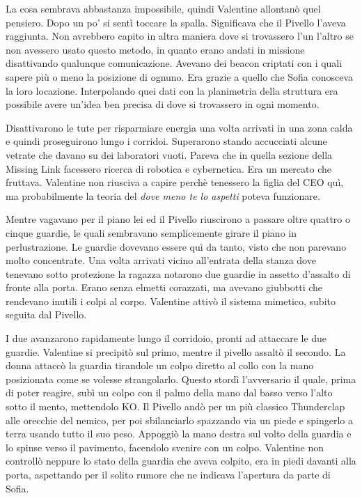     La cosa sembrava abbastanza impossibile, quindi Valentine allontanò quel pensiero. Dopo un po' si sentì toccare la
    spalla. Significava che il Pivello l'aveva raggiunta. Non avrebbero capito in altra maniera dove si trovassero l'un
    l'altro se non avessero usato questo metodo, in quanto erano andati in missione disattivando qualunque
    comunicazione. Avevano dei beacon criptati con i quali sapere più o meno la posizione di ognuno. Era grazie a quello
    che Sofia conosceva la loro locazione. Interpolando quei dati con la planimetria della struttura era possibile avere
    un'idea ben precisa di dove si trovassero in ogni momento.

    Disattivarono le tute per risparmiare energia una volta arrivati in una zona calda e quindi proseguirono lungo i
    corridoi. Superarono stando accucciati alcune vetrate che davano su dei laboratori vuoti. Pareva che in quella
    sezione della Missing Link facessero ricerca di robotica e cybernetica. Era un mercato che fruttava. Valentine non
    riusciva a capire perchè tenessero la figlia del CEO quì, ma probabilmente la teoria del \emph{dove meno te lo
    aspetti} poteva funzionare.

    Mentre vagavano per il piano lei ed il Pivello riuscirono a passare oltre quattro o cinque guardie, le quali
    sembravano semplicemente girare il piano in perlustrazione. Le guardie dovevano essere quì da tanto, visto che non
    parevano molto concentrate. Una volta arrivati vicino all'entrata della stanza dove tenevano sotto protezione la
    ragazza notarono due guardie in assetto d'assalto di fronte alla porta. Erano senza elmetti corazzati, ma avevano
    giubbotti che rendevano inutili i colpi al corpo. Valentine attivò il sistema mimetico, subito seguita dal Pivello.
    
    I due avanzarono rapidamente lungo il corridoio, pronti ad attaccare le due guardie. Valentine si precipitò sul
    primo, mentre il pivello assaltò il secondo. La donna attaccò la guardia tirandole un colpo diretto al collo con la
    mano posizionata come se volesse strangolarlo. Questo stordì l'avversario il quale, prima di poter reagire, subì un
    colpo con il palmo della mano dal basso verso l'alto sotto il mento, mettendolo KO. Il Pivello andò per un più
    classico Thunderclap alle orecchie del nemico, per poi sbilanciarlo spazzando via un piede e spingerlo a terra
    usando tutto il suo peso. Appoggiò la mano destra sul volto della guardia e lo spinse verso il pavimento, facendolo
    svenire con un colpo. Valentine non controllò neppure lo stato della guardia che aveva colpito, era in piedi davanti
    alla porta, aspettando per il solito rumore che ne indicava l'apertura da parte di Sofia.

